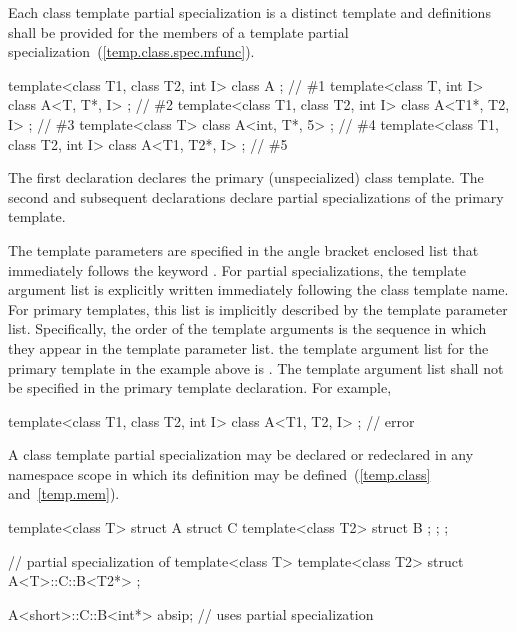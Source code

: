 \pnum
Each class template partial specialization is a distinct template and
definitions shall be provided for the members of a template partial
specialization~(\ref{temp.class.spec.mfunc}).

\pnum
\enterexample
\begin{codeblock}
template<class T1, class T2, int I> class A             { };    // \#1
template<class T, int I>            class A<T, T*, I>   { };    // \#2
template<class T1, class T2, int I> class A<T1*, T2, I> { };    // \#3
template<class T>                   class A<int, T*, 5> { };    // \#4
template<class T1, class T2, int I> class A<T1, T2*, I> { };    // \#5
\end{codeblock}

The first declaration declares the primary (unspecialized) class template.
The second and subsequent declarations declare partial specializations of
the primary template.
\exitexample

\pnum
The template parameters are specified in the angle bracket enclosed list
that immediately follows the keyword
.
For partial specializations, the template argument list is explicitly
written immediately following the class template name.
For primary templates, this list is implicitly described by the
template parameter list.
Specifically, the order of the template arguments is the sequence in
which they appear in the template parameter list.
\enterexample
the template argument list for the primary template in the example
above is
.
\exitexample
\enternote
The template argument list shall not be specified in the primary template
declaration.
For example,

\begin{codeblock}
template<class T1, class T2, int I> class A<T1, T2, I>  { };    // error
\end{codeblock}
\exitnote

\pnum
A class template partial specialization may be declared or redeclared in any
namespace scope in which its definition may be defined~(\ref{temp.class} and~\ref{temp.mem}).
\enterexample

\begin{codeblock}
template<class T> struct A {
  struct C {
    template<class T2> struct B { };
  };
};

// partial specialization of 
template<class T> template<class T2>
  struct A<T>::C::B<T2*> { };

A<short>::C::B<int*> absip;     // uses partial specialization
\end{codeblock}
\exitexample

